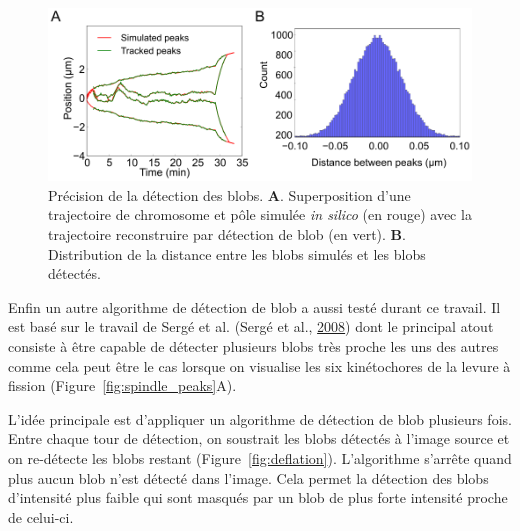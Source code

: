 \documentclass[12pt,a4paper,twoside,openright]{book}
\begin{document}
\begin{figure}[htbp]
\centering
\includegraphics{figures/results/imaging/detection_precision.png}
\caption[Précision de la détection des blobs]{\label{fig:detection_precision}Précision
de la détection des blobs. \textbf{A}. Superposition d'une trajectoire
de chromosome et pôle simulée \emph{in silico} (en rouge) avec la
trajectoire reconstruire par détection de blob (en vert). \textbf{B}.
Distribution de la distance entre les blobs simulés et les blobs
détectés.}
\end{figure}

Enfin un autre algorithme de détection de blob a aussi testé durant ce
travail. Il est basé sur le travail de Sergé et al. (Sergé et al.,
\hyperref[ref-Serge2008]{2008}) dont le principal atout consiste à être
capable de détecter plusieurs blobs très proche les uns des autres comme
cela peut être le cas lorsque on visualise les six kinétochores de la
levure à fission (Figure~\ref{fig:spindle_peaks}A).

L'idée principale est d'appliquer un algorithme de détection de blob
plusieurs fois. Entre chaque tour de détection, on soustrait les blobs
détectés à l'image source et on re-détecte les blobs restant
(Figure~\ref{fig:deflation}). L'algorithme s'arrête quand plus aucun
blob n'est détecté dans l'image. Cela permet la détection des blobs
d'intensité plus faible qui sont masqués par un blob de plus forte
intensité proche de celui-ci.
\end{document}
